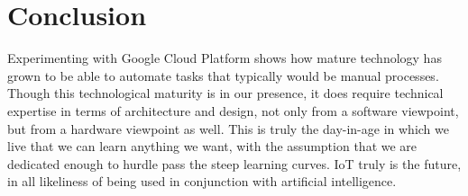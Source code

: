 \documentclass{article}
\begin{document}
\section{Conclusion}
Experimenting with Google Cloud Platform shows how mature technology has grown to be able to automate tasks that typically would be manual processes. Though this technological maturity is in our presence, it does require technical expertise in terms of architecture and design, not only from a software viewpoint, but from a hardware viewpoint as well. This is truly the day-in-age in which we live that we can learn anything we want, with the assumption that we are dedicated enough to hurdle pass the steep learning curves. IoT truly is the future, in all likeliness of being used in conjunction with artificial intelligence.
\end{document}
